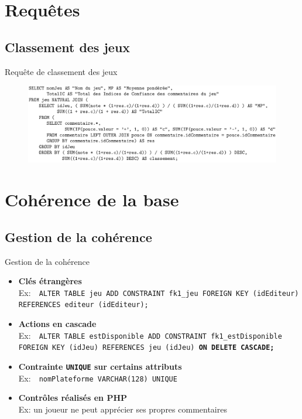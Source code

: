 \documentclass{beamer}
\begin{document}
\section{Requêtes}
\subsection{Classement des jeux}
\begin{frame}
\begin{block}{Requête de classement des jeux}
\begin{center}
\begin{figure}[t]
  \includegraphics[scale=0.3]{requete.png}
\end{figure}
\end{center}
\end{block}
\end{frame}


\section{Cohérence de la base}
\subsection{Gestion de la cohérence}
\begin{frame}
\begin{block}{Gestion de la cohérence}
\begin{itemize}
  \item {\textbf{Clés étrangères} \\
      \footnotesize{Ex:~~\texttt{ALTER TABLE jeu ADD CONSTRAINT fk1\_jeu FOREIGN KEY (idEditeur) REFERENCES editeur (idEditeur);}}}

  \item {\textbf{Actions en cascade} \\
    \footnotesize{Ex:~~\texttt{ALTER TABLE estDisponible ADD CONSTRAINT fk1\_estDisponible FOREIGN KEY (idJeu) REFERENCES jeu (idJeu) \textbf{ON DELETE CASCADE;}}}}
  \item{  \textbf{Contrainte \texttt{UNIQUE} sur certains attributs}\\
    \footnotesize{Ex:~~\texttt{nomPlateforme VARCHAR(128) UNIQUE}}}
  \item {\textbf{Contrôles réalisés en PHP}\\
    \footnotesize{Ex: un joueur ne peut apprécier ses propres commentaires}}

\end{itemize}
\end{block}
\end{frame}
\end{document}
